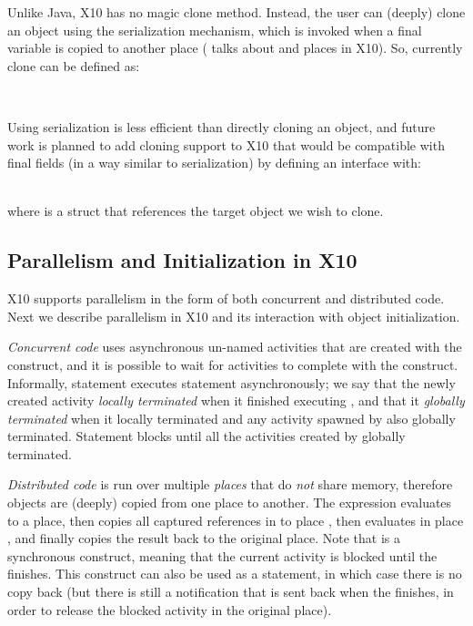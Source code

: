 Unlike Java, X10 has no magic clone method.
Instead, the user can (deeply) clone an object using the serialization mechanism,
    which is invoked when a final variable is copied to another place
    ( talks about  and places in X10).
So, currently clone can be defined as:

~~~~~~~~

Using serialization is less efficient than directly cloning an object,
    and future work is planned to add cloning support to X10
    that would be compatible with final fields
    (in a way similar to serialization) by defining an interface  with:

~~~~~~~~\\
where  is a struct that references the target object we wish to clone.




\subsection{Parallelism and Initialization in X10}
\label{Section:Parallelism}
X10 supports parallelism in the form of both concurrent and distributed code.
Next we describe parallelism in X10 and its interaction with object initialization.

\emph{Concurrent code} uses asynchronous un-named activities that are created with the  construct,
    and it is possible to wait for activities to complete with the  construct.
Informally, statement  executes statement  asynchronously;
    we say that the newly created activity \emph{locally terminated} when it finished executing ,
        and that it \emph{globally terminated} when it locally terminated and any activity spawned by 
            also globally terminated.
Statement  blocks until all the activities created by  globally terminated.

\emph{Distributed code} is run over multiple \emph{places} that do \emph{not} share memory,
    therefore objects are (deeply) copied from one place to another.
The expression  evaluates  to a place, then copies all captured references in  to place ,
    then evaluates  in place , and finally copies the result back to the original place.
Note that  is a synchronous construct, meaning that the current activity is blocked until the  finishes.
This construct can also be used as a statement, in which case there is no copy back
    (but there is still a notification that is sent back when the  finishes, in order to release the blocked activity in the original place).


